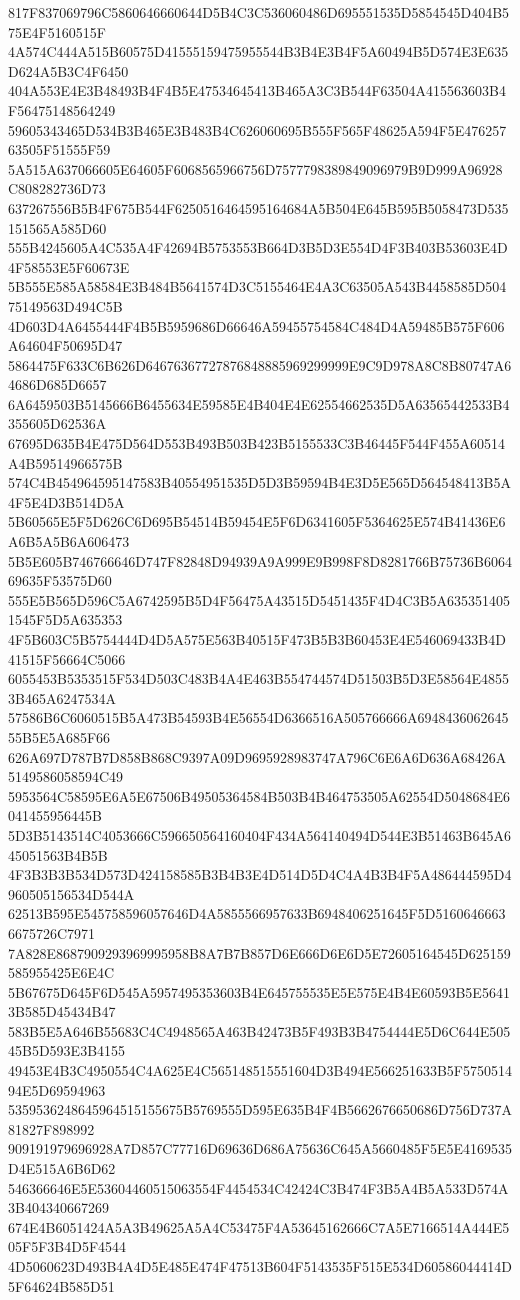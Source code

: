 {{{{{{{{{{{{{{{{{{{{{817F837069796C5860646660644D5B4C3C536060486D695551535D5854545D404B575E4F5160515F
4A574C444A515B60575D41555159475955544B3B4E3B4F5A60494B5D574E3E635D624A5B3C4F6450
404A553E4E3B48493B4F4B5E47534645413B465A3C3B544F63504A415563603B4F56475148564249
59605343465D534B3B465E3B483B4C626060695B555F565F48625A594F5E47625763505F51555F59
5A515A637066605E64605F6068565966756D7577798389849096979B9D999A96928C808282736D73
637267556B5B4F675B544F6250516464595164684A5B504E645B595B5058473D535151565A585D60
555B4245605A4C535A4F42694B5753553B664D3B5D3E554D4F3B403B53603E4D4F58553E5F60673E
5B555E585A58584E3B484B5641574D3C5155464E4A3C63505A543B4458585D50475149563D494C5B
4D603D4A6455444F4B5B5959686D66646A59455754584C484D4A59485B575F606A64604F50695D47
5864475F633C6B626D64676367727876848885969299999E9C9D978A8C8B80747A64686D685D6657
6A6459503B5145666B6455634E59585E4B404E4E62554662535D5A63565442533B4355605D62536A
67695D635B4E475D564D553B493B503B423B5155533C3B46445F544F455A60514A4B59514966575B
574C4B454964595147583B40554951535D5D3B59594B4E3D5E565D564548413B5A4F5E4D3B514D5A
5B60565E5F5D626C6D695B54514B59454E5F6D6341605F5364625E574B41436E6A6B5A5B6A606473
5B5E605B746766646D747F82848D94939A9A999E9B998F8D8281766B75736B606469635F53575D60
555E5B565D596C5A6742595B5D4F56475A43515D5451435F4D4C3B5A6353514051545F5D5A635353
4F5B603C5B5754444D4D5A575E563B40515F473B5B3B60453E4E546069433B4D41515F56664C5066
6055453B5353515F534D503C483B4A4E463B554744574D51503B5D3E58564E48553B465A6247534A
57586B6C6060515B5A473B54593B4E56554D6366516A505766666A694843606264555B5E5A685F66
626A697D787B7D858B868C9397A09D9695928983747A796C6E6A6D636A68426A5149586058594C49
5953564C58595E6A5E67506B49505364584B503B4B464753505A62554D5048684E6041455956445B
5D3B5143514C4053666C596650564160404F434A564140494D544E3B51463B645A645051563B4B5B
4F3B3B3B534D573D424158585B3B4B3E4D514D5D4C4A4B3B4F5A486444595D4960505156534D544A
62513B595E545758596057646D4A5855566957633B6948406251645F5D51606466636675726C7971
7A828E8687909293969995958B8A7B7B857D6E666D6E6D5E72605164545D625159585955425E6E4C
5B67675D645F6D545A5957495353603B4E645755535E5E575E4B4E60593B5E56413B585D45434B47
583B5E5A646B55683C4C4948565A463B42473B5F493B3B4754444E5D6C644E50545B5D593E3B4155
49453E4B3C4950554C4A625E4C565148515551604D3B494E566251633B5F575051494E5D69594963
5359536248645964515155675B5769555D595E635B4F4B5662676650686D756D737A81827F898992
909191979696928A7D857C77716D69636D686A75636C645A5660485F5E5E4169535D4E515A6B6D62
546366646E5E53604460515063554F4454534C42424C3B474F3B5A4B5A533D574A3B404340667269
674E4B6051424A5A3B49625A5A4C53475F4A53645162666C7A5E7166514A444E505F5F3B4D5F4544
4D5060623D493B4A4D5E485E474F47513B604F5143535F515E534D60586044414D5F64624B585D51
}}}}}}}}}}}}}}}}}}}}}

